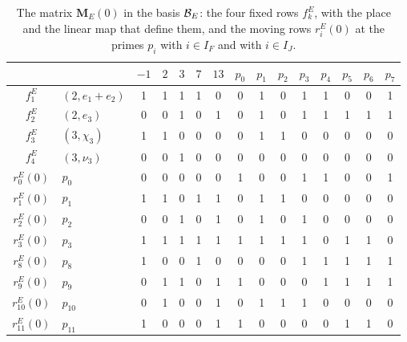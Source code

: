 \begin{table}[htbp]
\centering
\caption{The matrix $\mathbf M_E(0)$ in the basis $\mathcal B_E$: the four fixed
rows $f^E_k$, with the place and the linear map that define them, and the moving
rows $r^E_i(0)$ at the primes $p_i$ with $i\in I_F$ and with $i\in I_J$.}
\label{tab:r7-ME}
\small
\setlength{\tabcolsep}{4pt}
\begin{tabular}{cl@{\hspace{10pt}}ccccc@{\hspace{14pt}}cccccccc}
\toprule
 & & $-1$ & $2$ & $3$ & $7$ & $13$ & $p_0$ & $p_1$ & $p_2$ & $p_3$ & $p_4$ & $p_5$ & $p_6$ & $p_7$\\
\midrule
$f^E_1$ & $(2,e_1+e_2)$ & 1 & 1 & 1 & 1 & 0 & 0 & 1 & 0 & 1 & 1 & 0 & 0 & 1 \\
$f^E_2$ & $(2,e_3)$ & 0 & 0 & 1 & 0 & 1 & 0 & 1 & 0 & 1 & 1 & 1 & 1 & 1 \\
$f^E_3$ & $(3,\chi_3)$ & 1 & 1 & 0 & 0 & 0 & 0 & 1 & 1 & 0 & 0 & 0 & 0 & 0 \\
$f^E_4$ & $(3,\nu_3)$ & 0 & 0 & 1 & 0 & 0 & 0 & 0 & 0 & 0 & 0 & 0 & 0 & 0 \\
\addlinespace
$r^{E}_0(0)$ & $p_0$ & 0 & 0 & 0 & 0 & 0 & 1 & 0 & 0 & 1 & 1 & 0 & 0 & 1 \\
$r^{E}_1(0)$ & $p_1$ & 1 & 1 & 0 & 1 & 1 & 0 & 1 & 1 & 0 & 0 & 0 & 0 & 0 \\
$r^{E}_2(0)$ & $p_2$ & 0 & 0 & 1 & 0 & 1 & 0 & 1 & 0 & 1 & 0 & 0 & 0 & 0 \\
$r^{E}_3(0)$ & $p_3$ & 1 & 1 & 1 & 1 & 1 & 1 & 1 & 1 & 1 & 0 & 1 & 1 & 0 \\
\addlinespace
$r^{E}_8(0)$ & $p_8$ & 1 & 0 & 0 & 1 & 0 & 0 & 0 & 0 & 1 & 1 & 1 & 1 & 1 \\
$r^{E}_9(0)$ & $p_9$ & 0 & 1 & 1 & 0 & 1 & 1 & 0 & 0 & 0 & 1 & 1 & 1 & 1 \\
$r^{E}_{10}(0)$ & $p_{10}$ & 0 & 1 & 0 & 0 & 1 & 0 & 1 & 1 & 1 & 0 & 0 & 0 & 0 \\
$r^{E}_{11}(0)$ & $p_{11}$ & 1 & 0 & 0 & 0 & 1 & 1 & 0 & 0 & 0 & 0 & 1 & 1 & 0 \\
\bottomrule
\end{tabular}
\end{table}

